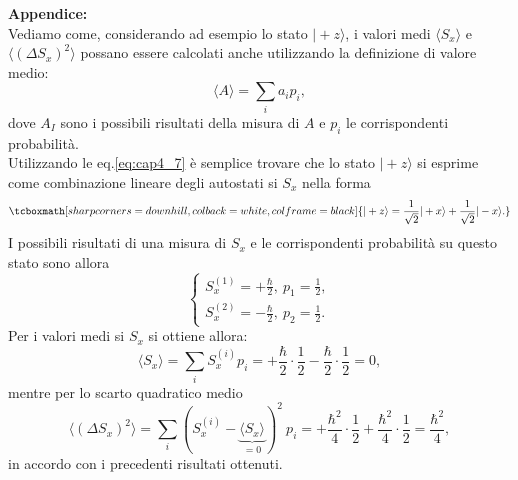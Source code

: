 \documentclass[a4paper,12pt,oneside]{book}
\begin{document}
\textbf{Appendice:}\\
Vediamo come, considerando ad esempio lo stato $\vert + z \rangle $, i valori medi $\langle S_x \rangle $ e $\langle (\Delta S_x)^2 \rangle $ possano essere calcolati anche utilizzando la definizione di valore medio:
	\begin{equation}
		\langle A \rangle = \sum _i a_i p_i,
	\end{equation}
dove $A_I$ sono i possibili risultati della misura di $A$ e $p_i$ le corrispondenti probabilità.\\
Utilizzando le eq.\eqref{eq:cap4_7} è semplice trovare che lo stato $\vert +z \rangle$ si esprime come combinazione lineare degli autostati si $S_x$ nella forma
	\begin{equation}
		\tcboxmath[sharp corners=downhill, colback=white, colframe=black]{
			\vert +z \rangle = \frac{1}{\sqrt{2}} \vert +x \rangle + \frac{1}{\sqrt{2}} \vert -x \rangle .
			}
	\end{equation}
I possibili risultati di una misura di $S_x$ e le corrispondenti probabilità su questo stato sono allora
	\begin{equation}
		\begin{cases}
		\displaystyle{S_x ^{(1)} = +\frac{\hbar}{2}, \ p_1 = \frac{1}{2}}, \\[.5cm]
		\displaystyle{S_x ^{(2)} = -\frac{\hbar}{2}, \ p_2 = \frac{1}{2}}.
		\end{cases}
	\end{equation}
Per i valori medi si $S_x$ si ottiene allora:
	\begin{equation}
		\langle S_x \rangle = \sum _i S_x ^{(i)} p_i= +\frac{\hbar}{2}\cdot\frac{1}{2}-\frac{\hbar}{2}\cdot\frac{1}{2}=0,
	\end{equation}
mentre per lo scarto quadratico medio
	\begin{equation}
		\langle (\Delta S_x)^2 \rangle = \sum _i ( S_x ^{(i)}- \underbrace{\langle S_x \rangle}_{=0}) ^2\ p_i= +\frac{\hbar ^2}{4}\cdot\frac{1}{2}+\frac{\hbar ^2}{4}\cdot\frac{1}{2}= \frac{\hbar ^2}{4},
	\end{equation}
in accordo con i precedenti risultati ottenuti.
\end{document}
